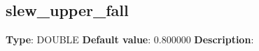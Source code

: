 \subsection*{slew_upper_fall}
\textbf{Type}: DOUBLE\newline
\textbf{Default value}: 0.800000\newline
\textbf{Description}: